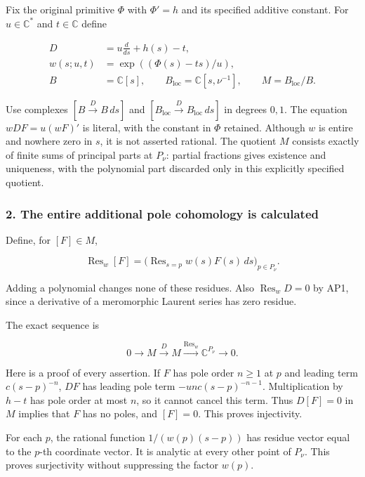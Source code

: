 Fix the original primitive \(\Phi\) with \(\Phi'=h\) and its specified additive constant. For \(u\in\mathbb{C}^{*}\) and \(t\in\mathbb{C}\) define

\[
\begin{aligned}
D&=u\frac{d}{ds}+h(s)-t,\\
w(s;u,t)&=\exp((\Phi(s)-t s)/u),\\
B&=\mathbb C[s],\qquad B_{\mathrm{loc}}=\mathbb C[s,\nu^{-1}],
\qquad M=B_{\mathrm{loc}}/B.
\end{aligned}
\tag{AP1}
\]

Use complexes \([B\xrightarrow{D}B\,ds]\) and \([B_{\mathrm{loc}}\xrightarrow{D}B_{\mathrm{loc}}\,ds]\) in degrees \(0,1\). The equation \(w D F = u (w F)'\) is literal, with the constant in \(\Phi\) retained. Although \(w\) is entire and nowhere zero in \(s\), it is not asserted rational. The quotient \(M\) consists exactly of finite sums of principal parts at \(P_{\nu}\): partial fractions gives existence and uniqueness, with the polynomial part discarded only in this explicitly specified quotient.

\subsubsection{2. The entire additional pole cohomology is calculated}\label{endpoint-analytic_pole--the-entire-additional-pole-cohomology-is-calculated}

Define, for \([F]\in M\),

\[
\operatorname{Res}_w[F]
=\bigl(\operatorname{Res}_{s=p}w(s)F(s)\,ds\bigr)_{p\in P_\nu}.
\tag{AP2}
\]

Adding a polynomial changes none of these residues. Also \(\operatorname{Res}_w D=0\) by AP1, since a derivative of a meromorphic Laurent series has zero residue.

The exact sequence is

\[
0\longrightarrow M\xrightarrow{D}M
\xrightarrow{\operatorname{Res}_w}\mathbb C^{P_\nu}\longrightarrow0.
\tag{AP3}
\]

Here is a proof of every assertion. If \(F\) has pole order \(n\geq1\) at \(p\) and leading term \(c(s-p)^{-n}\), \(D F\) has leading pole term \(-u n c(s-p)^{-n-1}\). Multiplication by \(h-t\) has pole order at most \(n\), so it cannot cancel this term. Thus \(D[F]=0\) in \(M\) implies that \(F\) has no poles, and \([F]=0\). This proves injectivity.

For each \(p\), the rational function \(1/(w(p)(s-p))\) has residue vector equal to the \(p\)-th coordinate vector. It is analytic at every other point of \(P_{\nu}\). This proves surjectivity without suppressing the factor \(w(p)\).

